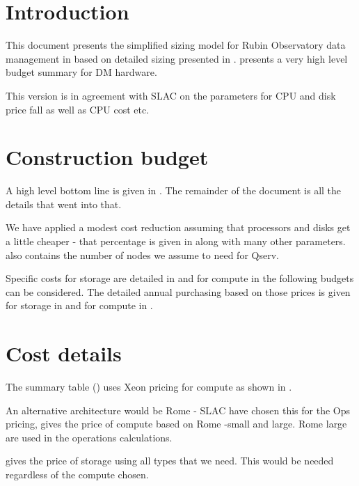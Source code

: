 \section{Introduction}
This document presents the simplified
  sizing model for Rubin Observatory data management  in  based on detailed sizing presented in .
 presents a very high level budget summary for
DM hardware.

This version is in agreement with SLAC on the parameters for CPU and disk price fall as well as CPU cost etc.

\section{Construction  budget}\label{sec:cost}

A high level bottom line is given in .
The remainder of the document is all the details that went into that.



We have applied a modest cost reduction assuming that processors  and disks get a little cheaper - that
percentage is given in  along with many other parameters.  also contains the number of nodes we assume to need for Qserv.

Specific  costs for storage are detailed in  and for compute in 
the following budgets can be considered. The detailed annual purchasing based on those prices is given for
storage in  and for compute in .




\section{Cost details}
The summary table ()  uses Xeon pricing for compute as shown in
.


An alternative architecture would be Rome - SLAC have chosen this for the Ops pricing,  gives the price of compute based on Rome -small and large.
Rome large are used in the operations calculations.


 gives the price of storage using all  types that we need.
This would be needed regardless of the compute chosen.



